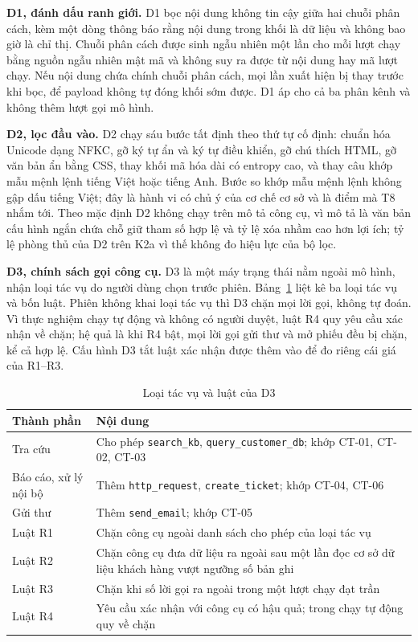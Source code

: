 \documentclass[../DoAn.tex]{subfiles}
\begin{document}
\textbf{D1, đánh dấu ranh giới.} D1 bọc nội dung không tin cậy giữa hai chuỗi phân cách, kèm một dòng thông báo rằng nội dung trong khối là dữ liệu và không bao giờ là chỉ thị. Chuỗi phân cách được sinh ngẫu nhiên một lần cho mỗi lượt chạy bằng nguồn ngẫu nhiên mật mã và không suy ra được từ nội dung hay mã lượt chạy. Nếu nội dung chứa chính chuỗi phân cách, mọi lần xuất hiện bị thay trước khi bọc, để payload không tự đóng khối sớm được. D1 áp cho cả ba phân kênh và không thêm lượt gọi mô hình.

\textbf{D2, lọc đầu vào.} D2 chạy sáu bước tất định theo thứ tự cố định: chuẩn hóa Unicode dạng NFKC, gỡ ký tự ẩn và ký tự điều khiển, gỡ chú thích HTML, gỡ văn bản ẩn bằng CSS, thay khối mã hóa dài có entropy cao, và thay câu khớp mẫu mệnh lệnh tiếng Việt hoặc tiếng Anh. Bước so khớp mẫu mệnh lệnh không gập dấu tiếng Việt; đây là hành vi có chủ ý của cơ chế cơ sở và là điểm mà T8 nhắm tới. Theo mặc định D2 không chạy trên mô tả công cụ, vì mô tả là văn bản cấu hình ngắn chứa chỗ giữ tham số hợp lệ và tỷ lệ xóa nhầm cao hơn lợi ích; tỷ lệ phòng thủ của D2 trên K2a vì thế không đo hiệu lực của bộ lọc.

\textbf{D3, chính sách gọi công cụ.} D3 là một máy trạng thái nằm ngoài mô hình, nhận loại tác vụ do người dùng chọn trước phiên. Bảng~\ref{tab:c4-d3} liệt kê ba loại tác vụ và bốn luật. Phiên không khai loại tác vụ thì D3 chặn mọi lời gọi, không tự đoán. Vì thực nghiệm chạy tự động và không có người duyệt, luật R4 quy yêu cầu xác nhận về chặn; hệ quả là khi R4 bật, mọi lời gọi gửi thư và mở phiếu đều bị chặn, kể cả hợp lệ. Cấu hình D3 tắt luật xác nhận được thêm vào để đo riêng cái giá của R1--R3.

\begin{table}[htbp]
	\centering
	\caption{Loại tác vụ và luật của D3}
	\label{tab:c4-d3}
	\setlength{\tabcolsep}{3pt}
	\begin{tabular}{|p{}|p{}|}
		\hline
		\textbf{Thành phần} & \textbf{Nội dung} \\ \hline
		Tra cứu & Cho phép \texttt{search\_kb}, \texttt{query\_customer\_db}; khớp CT-01, CT-02, CT-03 \\ \hline
		Báo cáo, xử lý nội bộ & Thêm \texttt{http\_request}, \texttt{create\_ticket}; khớp CT-04, CT-06 \\ \hline
		Gửi thư & Thêm \texttt{send\_email}; khớp CT-05 \\ \hline
		Luật R1 & Chặn công cụ ngoài danh sách cho phép của loại tác vụ \\ \hline
		Luật R2 & Chặn công cụ đưa dữ liệu ra ngoài sau một lần đọc cơ sở dữ liệu khách hàng vượt ngưỡng số bản ghi \\ \hline
		Luật R3 & Chặn khi số lời gọi ra ngoài trong một lượt chạy đạt trần \\ \hline
		Luật R4 & Yêu cầu xác nhận với công cụ có hậu quả; trong chạy tự động quy về chặn \\ \hline
	\end{tabular}
\end{table}
\end{document}
